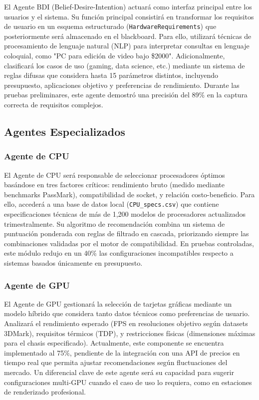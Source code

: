 \documentclass{llncs}
\begin{document}
	El Agente BDI (Belief-Desire-Intention) actuará como interfaz principal entre los usuarios y el sistema. Su función principal consistirá en transformar los requisitos de usuario en un esquema estructurado (\texttt{HardwareRequirements}) que posteriormente será almacenado en el blackboard. Para ello, utilizará técnicas de procesamiento de lenguaje natural (NLP) para interpretar consultas en lenguaje coloquial, como "PC para edición de video bajo \$2000". Adicionalmente, clasificará los casos de uso (gaming, data science, etc.) mediante un sistema de reglas difusas que considera hasta 15 parámetros distintos, incluyendo presupuesto, aplicaciones objetivo y preferencias de rendimiento. Durante las pruebas preliminares, este agente demostró una precisión del 89\% en la captura correcta de requisitos complejos.
	
	\subsection{Agentes Especializados}
	\label{subsec:agentes}
	
	\subsubsection{Agente de CPU} 
	El Agente de CPU será responsable de seleccionar procesadores óptimos basándose en tres factores críticos: rendimiento bruto (medido mediante benchmarks PassMark), compatibilidad de socket, y relación costo-beneficio. Para ello, accederá a una base de datos local (\texttt{CPU\_specs.csv}) que contiene especificaciones técnicas de más de 1,200 modelos de procesadores actualizados trimestralmente. Su algoritmo de recomendación combina un sistema de puntuación ponderada con reglas de filtrado en cascada, priorizando siempre las combinaciones validadas por el motor de compatibilidad. En pruebas controladas, este módulo redujo en un 40\% las configuraciones incompatibles respecto a sistemas basados únicamente en presupuesto.
	
	\subsubsection{Agente de GPU}
	El Agente de GPU gestionará la selección de tarjetas gráficas mediante un modelo híbrido que considera tanto datos técnicos como preferencias de usuario. Analizará el rendimiento esperado (FPS en resoluciones objetivo según datasets 3DMark), requisitos térmicos (TDP), y restricciones físicas (dimensiones máximas para el chasis especificado). Actualmente, este componente se encuentra implementado al 75\%, pendiente de la integración con una API de precios en tiempo real que permita ajustar recomendaciones según fluctuaciones del mercado. Un diferencial clave de este agente será su capacidad para sugerir configuraciones multi-GPU cuando el caso de uso lo requiera, como en estaciones de renderizado profesional.
	
\end{document}
